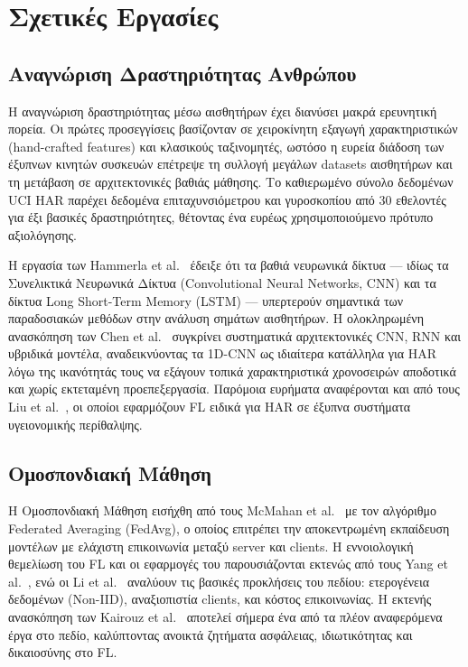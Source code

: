 
\section{Σχετικές Εργασίες}
\label{sec:related_work}

\subsection{Αναγνώριση Δραστηριότητας Ανθρώπου}

Η αναγνώριση δραστηριότητας μέσω αισθητήρων έχει διανύσει μακρά
ερευνητική πορεία. Οι πρώτες προσεγγίσεις βασίζονταν σε χειροκίνητη
εξαγωγή χαρακτηριστικών (hand-crafted features) και κλασικούς ταξινομητές,
ωστόσο η ευρεία διάδοση των έξυπνων κινητών συσκευών επέτρεψε τη συλλογή
μεγάλων datasets αισθητήρων και τη μετάβαση σε αρχιτεκτονικές βαθιάς
μάθησης. Το καθιερωμένο σύνολο δεδομένων UCI HAR \cite{Anguita2013}
παρέχει δεδομένα επιταχυνσιόμετρου και γυροσκοπίου από 30 εθελοντές για
έξι βασικές δραστηριότητες, θέτοντας ένα ευρέως χρησιμοποιούμενο πρότυπο
αξιολόγησης.

Η εργασία των Hammerla et al.\ \cite{Hammerla2016} έδειξε ότι τα βαθιά
νευρωνικά δίκτυα — ιδίως τα Συνελικτικά Νευρωνικά Δίκτυα (Convolutional
Neural Networks, CNN) και τα δίκτυα Long Short-Term Memory (LSTM) — υπερτερούν
σημαντικά των παραδοσιακών μεθόδων στην ανάλυση σημάτων αισθητήρων. Η
ολοκληρωμένη ανασκόπηση των Chen et al.\ \cite{Chen2021} συγκρίνει
συστηματικά αρχιτεκτονικές CNN, RNN και υβριδικά μοντέλα, αναδεικνύοντας
τα 1D-CNN ως ιδιαίτερα κατάλληλα για HAR λόγω της ικανότητάς τους να
εξάγουν τοπικά χαρακτηριστικά χρονοσειρών αποδοτικά και χωρίς
εκτεταμένη προεπεξεργασία. Παρόμοια ευρήματα αναφέρονται και από τους
Liu et al.\ \cite{Liu2021}, οι οποίοι εφαρμόζουν FL ειδικά για HAR σε
έξυπνα συστήματα υγειονομικής περίθαλψης.

\subsection{Ομοσπονδιακή Μάθηση}

Η Ομοσπονδιακή Μάθηση εισήχθη από τους McMahan et al.\ \cite{McMahan2017}
με τον αλγόριθμο Federated Averaging (FedAvg), ο οποίος επιτρέπει την
αποκεντρωμένη εκπαίδευση μοντέλων με ελάχιστη επικοινωνία μεταξύ server
και clients. Η εννοιολογική θεμελίωση του FL και οι εφαρμογές του
παρουσιάζονται εκτενώς από τους Yang et al.\ \cite{Yang2019}, ενώ οι Li
et al.\ \cite{Li2020} αναλύουν τις βασικές προκλήσεις του πεδίου:
ετερογένεια δεδομένων (Non-IID), αναξιοπιστία clients, και κόστος
επικοινωνίας. Η εκτενής ανασκόπηση των Kairouz et al.\ \cite{Kairouz2021}
αποτελεί σήμερα ένα από τα πλέον αναφερόμενα έργα στο πεδίο, καλύπτοντας
ανοικτά ζητήματα ασφάλειας, ιδιωτικότητας και δικαιοσύνης στο FL.

